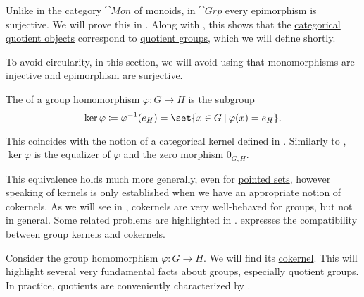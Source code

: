 \begin{definition}
\begin{thmenum}
    Unlike in the category \hyperref[def:monoid/category]{\( \cat{Mon} \)} of monoids, in \( \cat{Grp} \) every epimorphism is surjective. We will prove this in . Along with , this shows that the \hyperref[def:subobject_and_quotient]{categorical quotient objects} correspond to \hyperref[def:group/quotient]{quotient groups}, which we will define shortly.

    To avoid circularity, in this section, we will avoid using that monomorphisms are injective and epimorphism are surjective.

     The  of a group homomorphism \( \varphi: G \to H \) is the subgroup
    \begin{equation*}
      \ker \varphi \coloneqq \varphi^{-1}(e_H) = \set{ x \in G \given \varphi(x) = e_H }.
    \end{equation*}

    This coincides with the notion of a categorical kernel defined in . Similarly to , \( \ker \varphi \) is the equalizer of \( \varphi \) and the zero morphism \( 0_{G,H} \).

    This equivalence holds much more generally, even for \hyperref[def:pointed_set]{pointed sets}, however speaking of kernels is only established when we have an appropriate notion of cokernels. As we will see in , cokernels are very well-behaved for groups, but not in general. Some related problems are highlighted in \cite[ch. 8]{Golan2010}.  expresses the compatibility between group kernels and cokernels.

     Consider the group homomorphism \( \varphi: G \to H \). We will find its \hyperref[def:zero_morphisms/cokernel]{cokernel}. This will highlight several very fundamental facts about groups, especially quotient groups. In practice, quotients are conveniently characterized by .


\end{thmenum}
\end{definition}
